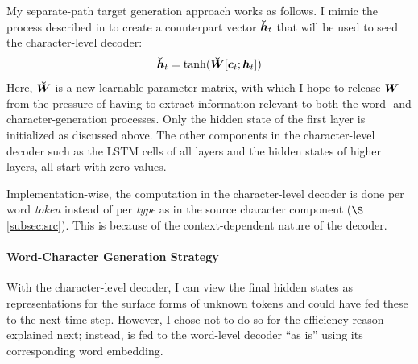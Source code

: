 My separate-path target generation approach works as follows. I mimic the
process described in  to create a counterpart vector $\mbox{\boldmath{$\breve{h}$}}_{t}$ that will be
used to seed the character-level decoder:
\begin{equation}
\mbox{\boldmath{$\breve{h}$}}_{t} = \tanh(\mbox{\boldmath{$\breve{W}$}}[\mbox{\boldmath{$c$}}_{t}; \mbox{\boldmath{$h$}}_{t}])
\label{e:hc}
\end{equation} 
Here, $\mbox{\boldmath{$\breve{W}$}}$ is a new learnable parameter matrix, with which I
hope to release $\bm{W}_{}$ from the pressure of having to extract information
relevant to both the word- and character-generation processes.
Only the hidden
state of the first layer is initialized as discussed above. The other components
in the character-level decoder such as the
LSTM cells of all layers and the hidden states of higher layers, all start with zero values.


Implementation-wise, the computation in the
character-level decoder is done per word {\it token} instead of per {\it type} as in the source
character component ($\S$\ref{subsec:src}). 
This is because of the context-dependent nature of the decoder.



\paragraph{Word-Character Generation Strategy}
\label{subsubsec:strategy}
With the character-level decoder, I can view the final hidden states as representations for
the surface forms of unknown tokens and could have fed these to the next
time step. However, I chose not to do so for the efficiency reason explained
next; instead, \unk{} is fed to the word-level decoder
``as is'' using its corresponding word embedding.

